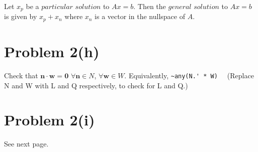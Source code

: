 \documentclass{article}
\begin{document}
Let $x_p$ be a $particular $ $solution$ to $Ax = b$. Then the $general$ $ solution$ to $Ax = b$ is given by $x_p + x_n$ where $x_n$ is a vector in the nullspace of $A$.



\section*{Problem 2(h)}


Check that $\mathbf{n} \cdot \mathbf{w} = \mathbf{0}$ $ \forall \mathbf{n} \in N$, $ \forall \mathbf{w} \in W$. Equivalently, \verb#~any(N.' * W)  # (Replace N and W with L and Q respectively, to check for L and Q.)

\section*{Problem 2(i)}

See next page.

\end{document}
